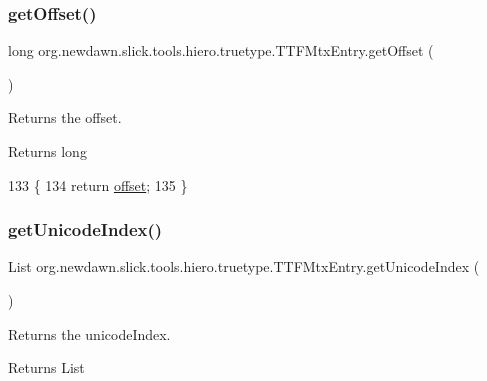 \subsubsection{\texorpdfstring{get\+Offset()}{getOffset()}}
{\footnotesize\ttfamily long org.\+newdawn.\+slick.\+tools.\+hiero.\+truetype.\+T\+T\+F\+Mtx\+Entry.\+get\+Offset (\begin{DoxyParamCaption}{ }\end{DoxyParamCaption})\hspace{0.3cm}{\ttfamily [inline]}}

Returns the offset. \begin{DoxyReturn}{Returns}
long 
\end{DoxyReturn}

\begin{DoxyCode}
133                             \{
134         \textcolor{keywordflow}{return} \mbox{\hyperlink{classorg_1_1newdawn_1_1slick_1_1tools_1_1hiero_1_1truetype_1_1_t_t_f_mtx_entry_a85ab264e853728a03b18417ab1511575}{offset}};
135     \}
\end{DoxyCode}
\mbox{\label{classorg_1_1newdawn_1_1slick_1_1tools_1_1hiero_1_1truetype_1_1_t_t_f_mtx_entry_a79a6c962b51cadf170541ef839267b87}} 
\subsubsection{\texorpdfstring{get\+Unicode\+Index()}{getUnicodeIndex()}}
{\footnotesize\ttfamily List org.\+newdawn.\+slick.\+tools.\+hiero.\+truetype.\+T\+T\+F\+Mtx\+Entry.\+get\+Unicode\+Index (\begin{DoxyParamCaption}{ }\end{DoxyParamCaption})\hspace{0.3cm}{\ttfamily [inline]}}

Returns the unicode\+Index. \begin{DoxyReturn}{Returns}
List 
\end{DoxyReturn}

